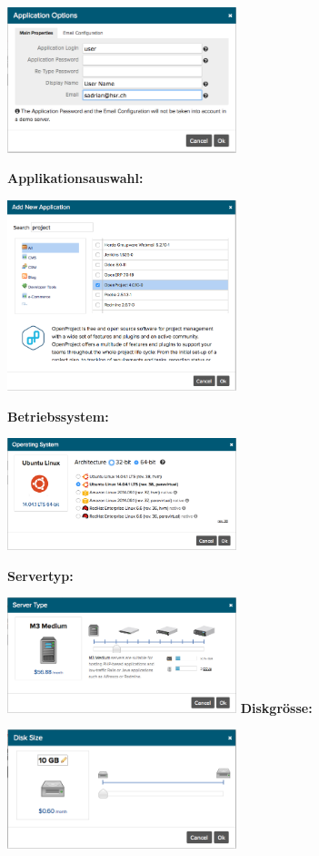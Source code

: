 \includegraphics[width=0.5\textwidth]{./03_Analyse/03_Bitnami/images/aws_application_options}

\textbf{Applikationsauswahl:}

\includegraphics[width=0.5\textwidth]{./03_Analyse/03_Bitnami/images/aws_add_application}

\textbf{Betriebssystem:}

\includegraphics[width=0.5\textwidth]{./03_Analyse/03_Bitnami/images/aws_operating_system}

\textbf{Servertyp:}

\includegraphics[width=0.5\textwidth]{./03_Analyse/03_Bitnami/images/aws_servertype}
\newpage
\textbf{Diskgrösse:}

\includegraphics[width=0.5\textwidth]{./03_Analyse/03_Bitnami/images/aws_disk}

